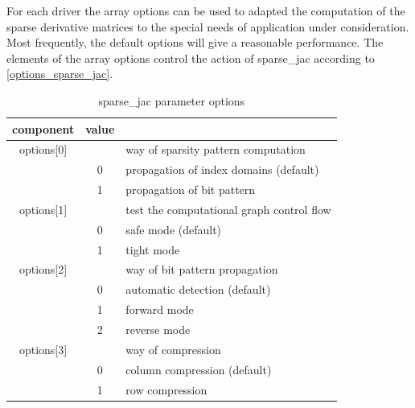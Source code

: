 \documentclass[11pt,twoside]{article}
\begin{document}
For each driver the array {\sf options} can be used to adapted the 
computation of the sparse derivative matrices to the special
needs of application under consideration. Most frequently, the default options
will give a reasonable performance. The elements of the array {\sf options} control the action of 
{\sf sparse\_jac} according to \autoref{options_sparse_jac}.
\begin{table}[h]
\center
\begin{tabular}{|c|c|l|} \hline
component & value &  \\ \hline
{\sf options[0]} &    &  way of sparsity pattern computation \\
                 & 0  &  propagation of index domains (default) \\
                 & 1  &  propagation of bit pattern \\ \hline
{\sf options[1]} &    &  test the computational graph control flow \\
                 & 0  &  safe mode (default) \\
                 & 1  &  tight mode \\ \hline
{\sf options[2]} &    &  way of bit pattern propagation \\
                 & 0  &  automatic detection (default) \\
                 & 1  &  forward mode \\ 
                 & 2  &  reverse mode \\ \hline
{\sf options[3]} &    &  way of compression \\
                 & 0  &  column compression (default) \\
                 & 1  &  row compression \\ \hline
\end{tabular}
\caption{ {\sf sparse\_jac} parameter {\sf options}\label{options_sparse_jac}}
\end{table}           
\end{document}
